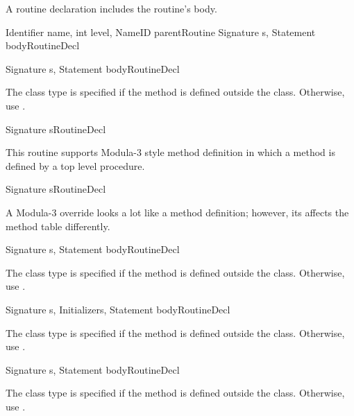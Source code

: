 A routine declaration includes the routine's body.  

	{Identifier name, int level, NameID parentRoutine} 
	{Signature s, Statement body}{RoutineDecl}

	{Signature s, Statement body}{RoutineDecl}
\begin{functionality}
The class type is specified if the method is defined outside the
class.  Otherwise, use .
\end{functionality}

	{Signature s}{RoutineDecl}
\begin{functionality}
This routine supports Modula-3 style method definition in which a
method is defined by a top level procedure.
\end{functionality}

	{Signature s}{RoutineDecl}
\begin{functionality}
A Modula-3 override looks a lot like a method definition; however, its
affects the method table differently.
\end{functionality}

	{Signature s, Statement body}{RoutineDecl}
\begin{functionality}
The class type is specified if the method is defined outside the
class.  Otherwise, use .
\end{functionality}

	{Signature s, Initializers, Statement body}{RoutineDecl}
\begin{functionality}
The class type is specified if the method is defined outside the
class.  Otherwise, use .
\end{functionality}

	{Signature s, Statement body}{RoutineDecl}
\begin{functionality}
The class type is specified if the method is defined outside the
class.  Otherwise, use .
\end{functionality}

